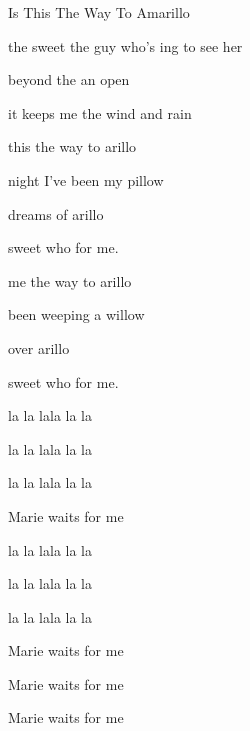 \begin{SBSong}{Is This The Way To Amarillo}
\begin{SBVerse}
     the sweet    the guy who's ing to see her
    
     beyond the   an open 
    
     it keeps me    the wind and rain
  \end{SBVerse} 
  \CBPageBrk
  \begin{SBChorus}
     this the way to arillo 
    
     night I've been  my pillow 
    
     dreams of arillo 
    
     sweet  who  for me.
    
     me the way to arillo 
    
     been weeping  a willow 
    
     over arillo 
    
     sweet  who  for me.
  \end {SBChorus}
  \WBPageBrk
  \begin{SBVerse}
     la la lala la la  
    
     la la lala la la  
     
     la la lala la la 
    
     Marie  waits for me
    
     la la lala la la  
    
     la la lala la la  
     
     la la lala la la 
    
     Marie  waits for me
    
     Marie  waits for me
    
     Marie  waits for me  
  \end{SBVerse}
\end{SBSong}
